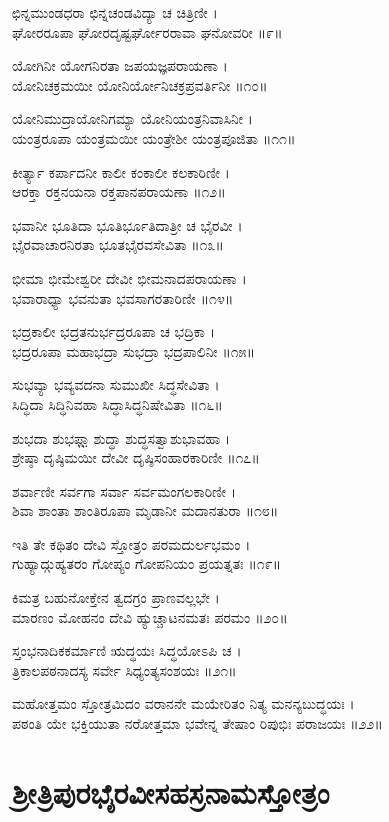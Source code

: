 ಛಿನ್ನಮುಂಡಧರಾ ಛಿನ್ನಚಂಡವಿದ್ಯಾ ಚ ಚಿತ್ರಿಣೀ ।\\
ಘೋರರೂಪಾ ಘೋರದೃಷ್ಟರ್ಘೋರರಾವಾ ಘನೋವರೀ ॥೯॥

ಯೋಗಿನೀ ಯೋಗನಿರತಾ ಜಪಯಜ್ಞಪರಾಯಣಾ ।\\
ಯೋನಿಚಕ್ರಮಯೀ ಯೋನಿರ್ಯೋನಿಚಕ್ರಪ್ರವರ್ತಿನೀ ॥೧೦॥

ಯೋನಿಮುದ್ರಾಯೋನಿಗಮ್ಯಾ ಯೋನಿಯಂತ್ರನಿವಾಸಿನೀ ।\\
ಯಂತ್ರರೂಪಾ ಯಂತ್ರಮಯೀ ಯಂತ್ರೇಶೀ ಯಂತ್ರಪೂಜಿತಾ ॥೧೧॥

ಕೀರ್ತ್ಯಾ ಕರ್ಪಾದನೀ ಕಾಲೀ ಕಂಕಾಲೀ ಕಲಕಾರಿಣೀ ।\\
ಆರಕ್ತಾ ರಕ್ತನಯನಾ ರಕ್ತಪಾನಪರಾಯಣಾ ॥೧೨॥

ಭವಾನೀ ಭೂತಿದಾ ಭೂತಿರ್ಭೂತಿದಾತ್ರೀ ಚ ಭೈರವೀ ।\\
ಭೈರವಾಚಾರನಿರತಾ ಭೂತಭೈರವಸೇವಿತಾ ॥೧೩॥

ಭೀಮಾ ಭೀಮೇಶ್ವರೀ ದೇವೀ ಭೀಮನಾದಪರಾಯಣಾ ।\\
ಭವಾರಾಧ್ಯಾ ಭವನುತಾ ಭವಸಾಗರತಾರಿಣೀ ॥೧೪॥

ಭದ್ರಕಾಲೀ ಭದ್ರತನುರ್ಭದ್ರರೂಪಾ ಚ ಭದ್ರಿಕಾ ।\\
ಭದ್ರರೂಪಾ ಮಹಾಭದ್ರಾ ಸುಭದ್ರಾ ಭದ್ರಪಾಲಿನೀ ॥೧೫॥

ಸುಭವ್ಯಾ ಭವ್ಯವದನಾ ಸುಮುಖೀ ಸಿದ್ಧಸೇವಿತಾ ।\\
ಸಿದ್ಧಿದಾ ಸಿದ್ಧಿನಿವಹಾ ಸಿದ್ಧಾಸಿದ್ಧನಿಷೇವಿತಾ ॥೧೬॥

ಶುಭದಾ ಶುಭಫ಼್ಗಾ ಶುದ್ಧಾ ಶುದ್ಧಸತ್ವಾಶುಭಾವಹಾ ।\\
ಶ್ರೇಷ್ಠಾ ದೃಷ್ಠಿಮಯೀ ದೇವೀ ದೃಷ್ಠಿಸಂಹಾರಕಾರಿಣೀ ॥೧೭॥

ಶರ್ವಾಣೀ ಸರ್ವಗಾ ಸರ್ವಾ ಸರ್ವಮಂಗಲಕಾರಿಣೀ ।\\
ಶಿವಾ ಶಾಂತಾ ಶಾಂತಿರೂಪಾ ಮೃಡಾನೀ ಮದಾನತುರಾ ॥೧೮॥

ಇತಿ ತೇ ಕಥಿತಂ ದೇವಿ ಸ್ತೋತ್ರಂ ಪರಮದುರ್ಲಭಮಂ ।\\
ಗುಹ್ಯಾದ್ಗುಹ್ಯತರಂ ಗೋಪ್ಯಂ ಗೋಪನಿಯಂ ಪ್ರಯತ್ನತಃ ॥೧೯॥

ಕಿಮತ್ರ ಬಹುನೋಕ್ತೇನ ತ್ವದಗ್ರಂ ಪ್ರಾಣವಲ್ಲಭೇ ।\\
ಮಾರಣಂ ಮೋಹನಂ ದೇವಿ ಹ್ಯುಚ್ಚಾಟನಮತಃ ಪರಮಂ ॥೨೦॥

ಸ್ತಂಭನಾದಿಕಕರ್ಮಾಣಿ ಋದ್ಧಯಃ ಸಿದ್ಧಯೋಽಪಿ ಚ ।\\
ತ್ರಿಕಾಲಪಠನಾದಸ್ಯ ಸರ್ವೇ ಸಿಧ್ಯಂತ್ಯಸಂಶಯಃ ॥೨೧॥

ಮಹೋತ್ತಮಂ ಸ್ತೋತ್ರಮಿದಂ ವರಾನನೇ ಮಯೇರಿತಂ ನಿತ್ಯ ಮನನ್ಯಬುದ್ಧಯಃ ।\\
ಪಠಂತಿ ಯೇ ಭಕ್ತಿಯುತಾ ನರೋತ್ತಮಾ ಭವೇನ್ನ ತೇಷಾಂ ರಿಪುಭಿಃ ಪರಾಜಯಃ ॥೨೨॥

\section{ಶ್ರೀತ್ರಿಪುರಭೈರವೀಸಹಸ್ರನಾಮಸ್ತೋತ್ರಂ}

